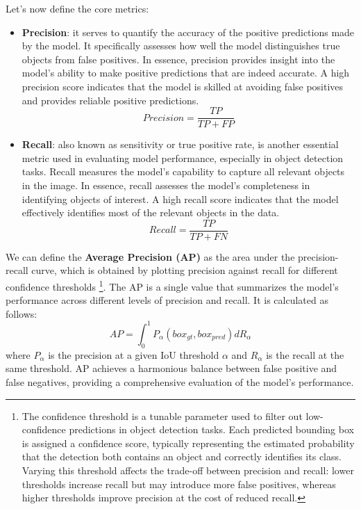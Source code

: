 Let's now define the core metrics: 
\begin{itemize}
    \item \textbf{Precision}: it serves to quantify the accuracy of the positive predictions made by the model. It specifically assesses how well the model distinguishes true objects from false positives. In essence, precision provides insight into the model’s ability to make positive predictions that are indeed accurate. A high precision score indicates that the model is skilled at avoiding false positives and provides reliable positive predictions.
    \begin{equation}
        Precision = \frac{TP}{TP + FP}
    \end{equation}

    \item \textbf{Recall}: also known as sensitivity or true positive rate, is another essential metric used in evaluating model performance, especially in object detection tasks. Recall measures the model’s capability to capture all relevant objects in the image. In essence, recall assesses the model’s completeness in identifying objects of interest. A high recall score indicates that the model effectively identifies most of the relevant objects in the data.
    \begin{equation}
        Recall = \frac{TP}{TP + FN}
    \end{equation}
\end{itemize}
We can define the \textbf{Average Precision (AP)} as the area under the precision-recall curve, which is obtained by plotting precision against recall for different confidence thresholds \footnote{The confidence threshold is a tunable parameter used to filter out low-confidence predictions in object detection tasks. Each predicted bounding box is assigned a confidence score, typically representing the estimated probability that the detection both contains an object and correctly identifies its class. Varying this threshold affects the trade-off between precision and recall: lower thresholds increase recall but may introduce more false positives, whereas higher thresholds improve precision at the cost of reduced recall.}. The AP is a single value that summarizes the model's performance across different levels of precision and recall. It is calculated as follows:
\begin{equation}
    AP = \int_{0}^{1} P_{\alpha}(box_{gt}, box_{pred}) dR_{\alpha}
\end{equation}
where \( P_{\alpha} \) is the precision at a given IoU threshold \( \alpha \) and \( R_{\alpha} \) is the recall at the same threshold. AP achieves a harmonious balance between false positive and false negatives, providing a comprehensive evaluation of the model's performance. 

